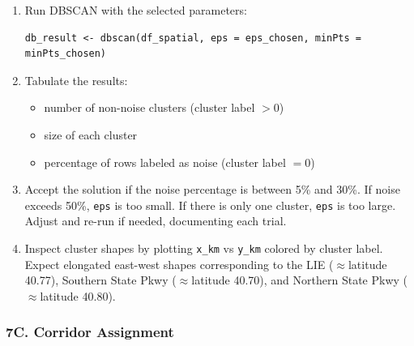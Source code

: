 \documentclass[11pt]{article}
\begin{document}
\begin{enumerate}
  \item Run DBSCAN with the selected parameters:
  \begin{verbatim}
db_result <- dbscan(df_spatial, eps = eps_chosen, minPts = minPts_chosen)
  \end{verbatim}

  \item Tabulate the results:
  \begin{itemize}
    \item number of non-noise clusters (cluster label $> 0$)
    \item size of each cluster
    \item percentage of rows labeled as noise (cluster label $= 0$)
  \end{itemize}

  \item Accept the solution if the noise percentage is between 5\% and 30\%. If noise exceeds 50\%, \texttt{eps} is too small. If there is only one cluster, \texttt{eps} is too large. Adjust and re-run if needed, documenting each trial.

  \item Inspect cluster shapes by plotting \texttt{x\_km} vs \texttt{y\_km} colored by cluster label. Expect elongated east-west shapes corresponding to the LIE ($\approx$latitude 40.77), Southern State Pkwy ($\approx$latitude 40.70), and Northern State Pkwy ($\approx$latitude 40.80).
\end{enumerate}

\subsubsection*{7C. Corridor Assignment}
\end{document}
